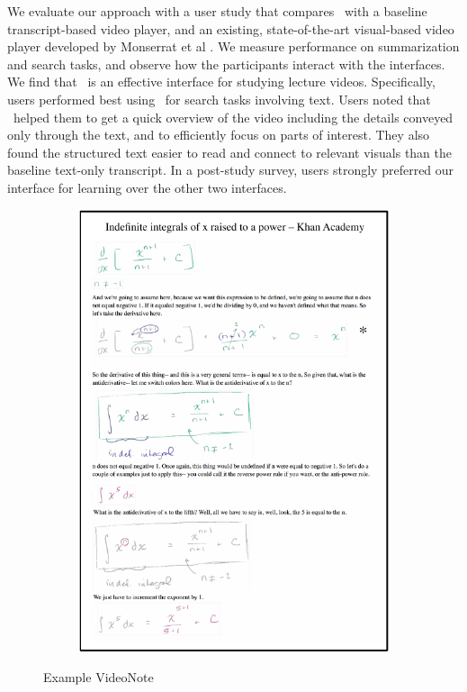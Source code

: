 We evaluate our approach with a user study that compares \systemname\ with a baseline transcript-based video player, and an existing, state-of-the-art visual-based video player developed by Monserrat et al \cite{monserrat2013notevideo}. We measure performance on summarization and search tasks, and observe how the participants interact with the interfaces. We find that \systemname\ is an effective interface for studying lecture videos. Specifically, users performed best using \systemname\ for search tasks involving text. Users noted that \systemname\ helped them to get a quick overview of the video including the details conveyed only through the text, and to efficiently focus on parts of interest. They also found the structured text easier to read and connect to relevant visuals than the baseline text-only transcript. In a post-study survey, users strongly preferred our interface for learning over the other two interfaces.\\
\begin{figure}[ht!]
        \centering
        \begin{subfigure}[b]{\textwidth}
        \includegraphics[width=\textwidth]{figures/khan3_page1.pdf}
        \end{subfigure}
        \caption{Example VideoNote}
        \end{figure}

